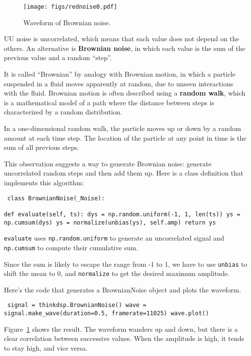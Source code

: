 \documentclass[12pt]{book} \usepackage[width=5.5in,height=8.5in, hmarginratio=3:2,vmarginratio=1:1]{geometry}
\begin{document}
\begin{figure} 

\centerline{\texttt{[image: figs/rednoise0.pdf]}} \caption{Waveform of Brownian noise.} \label{fig.rednoise0} \end{figure} 

UU noise is uncorrelated, which means that each value does not depend on the others. An alternative is {\bf Brownian noise}, in which each value is the sum of the previous value and a random ``step''. 

It is called ``Brownian'' by analogy with Brownian motion, in which a particle suspended in a fluid moves apparently at random, due to unseen interactions with the fluid. Brownian motion is often described using a {\bf random walk}, which is a mathematical model of a path where the distance between steps is characterized by a random distribution. 

In a one-dimensional random walk, the particle moves up or down by a random amount at each time step. The location of the particle at any point in time is the sum of all previous steps. 

This observation suggests a way to generate Brownian noise: generate uncorrelated random steps and then add them up. Here is a class definition that implements this algorithm: 

\begin{verbatim} class BrownianNoise(_Noise): 

def evaluate(self, ts): dys = np.random.uniform(-1, 1, len(ts)) ys = np.cumsum(dys) ys = normalize(unbias(ys), self.amp) return ys \end{verbatim} 

{\tt evaluate} uses {\tt np.random.uniform} to generate an uncorrelated signal and {\tt np.cumsum} to compute their cumulative sum. 

Since the sum is likely to escape the range from -1 to 1, we have to use {\tt unbias} to shift the mean to 0, and {\tt normalize} to get the desired maximum amplitude. 

Here's the code that generates a BrownianNoise object and plots the waveform. 

\begin{verbatim} signal = thinkdsp.BrownianNoise() wave = signal.make_wave(duration=0.5, framerate=11025) wave.plot() \end{verbatim} 

Figure~\ref{fig.rednoise0} shows the result. The waveform wanders up and down, but there is a clear correlation between successive values. When the amplitude is high, it tends to stay high, and vice versa. 
\end{document}
